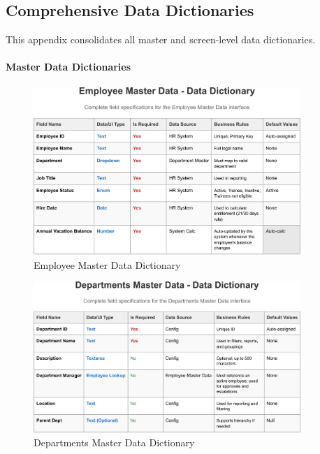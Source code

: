 \documentclass[12pt,a4paper]{article}
\begin{document}
\subsection{Comprehensive Data Dictionaries}
This appendix consolidates all master and screen-level data dictionaries.

\paragraph{Master Data Dictionaries}
\begin{figure}[H]
\centering
\includegraphics[width=0.9\textwidth]{Data-Dictionary/Master-Data-Dictionaries/Employee-Master-Data-Data-Dictionary/Employee-Master-Data-Data-Dictionary-1.png}
\caption{Employee Master Data Dictionary}
\label{fig:employee-master-data}
\end{figure}

\begin{figure}[H]
\centering
\includegraphics[width=0.9\textwidth]{Data-Dictionary/Master-Data-Dictionaries/Departments-Master-Data-Data-Dictionary/Departments-Master-Data-Data-Dictionary-1.png}
\caption{Departments Master Data Dictionary}
\label{fig:departments-master-data}
\end{figure}
\end{document}
